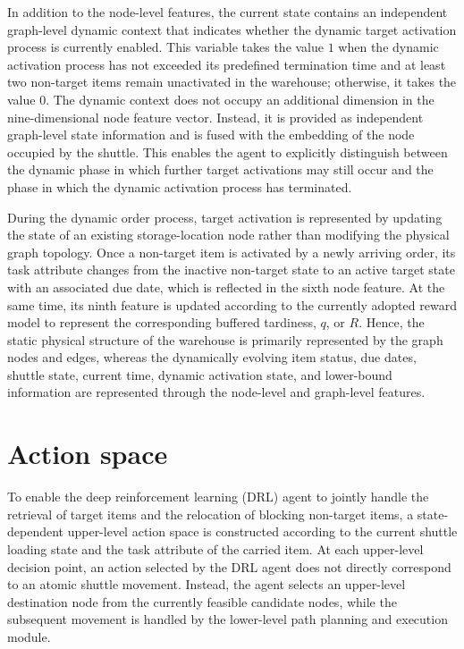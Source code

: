 In addition to the node-level features, the current state contains an independent graph-level dynamic context that indicates whether the dynamic target activation process is currently enabled. This variable takes the value $1$ when the dynamic activation process has not exceeded its predefined termination time and at least two non-target items remain unactivated in the warehouse; otherwise, it takes the value $0$. The dynamic context does not occupy an additional dimension in the nine-dimensional node feature vector. Instead, it is provided as independent graph-level state information and is fused with the embedding of the node occupied by the shuttle. This enables the agent to explicitly distinguish between the dynamic phase in which further target activations may still occur and the phase in which the dynamic activation process has terminated.

During the dynamic order process, target activation is represented by updating the state of an existing storage-location node rather than modifying the physical graph topology. Once a non-target item is activated by a newly arriving order, its task attribute changes from the inactive non-target state to an active target state with an associated due date, which is reflected in the sixth node feature. At the same time, its ninth feature is updated according to the currently adopted reward model to represent the corresponding buffered tardiness, $q$, or $R$. Hence, the static physical structure of the warehouse is primarily represented by the graph nodes and edges, whereas the dynamically evolving item status, due dates, shuttle state, current time, dynamic activation state, and lower-bound information are represented through the node-level and graph-level features.

\section{Action space}

To enable the deep reinforcement learning (DRL) agent to jointly handle the retrieval of target items and the relocation of blocking non-target items, a state-dependent upper-level action space is constructed according to the current shuttle loading state and the task attribute of the carried item. At each upper-level decision point, an action selected by the DRL agent does not directly correspond to an atomic shuttle movement. Instead, the agent selects an upper-level destination node from the currently feasible candidate nodes, while the subsequent movement is handled by the lower-level path planning and execution module.

